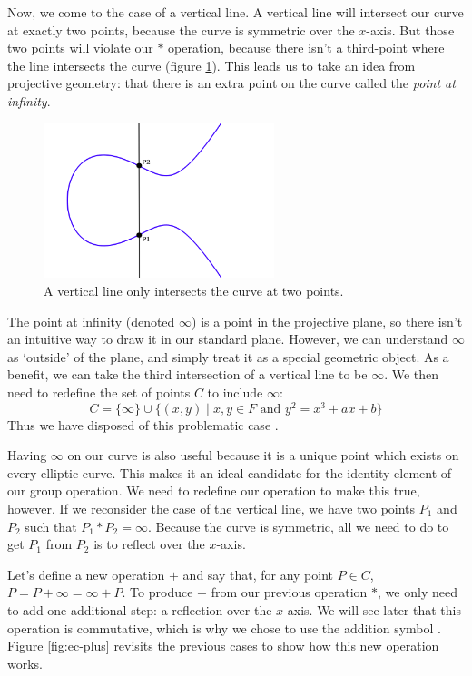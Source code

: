 \documentclass{article}
\begin{document}
Now, we come to the case of a vertical line.
A vertical line will intersect our curve at exactly two points, because the curve is symmetric over the $x$-axis.
But those two points will violate our $*$ operation, because there isn't a third-point where the line intersects the curve (figure \ref{fig:ec-infinity}).
This leads us to take an idea from projective geometry: that there is an extra point on the curve called the \textit{point at infinity}.

\begin{figure}[h]
\centering
\includegraphics[width=0.6\textwidth]{images/ec4-infinity.png}
\caption{A vertical line only intersects the curve at two points.}
\label{fig:ec-infinity}
\end{figure}

The point at infinity (denoted $\infty$) is a point in the projective plane, so there isn't an intuitive way to draw it in our standard plane.
However, we can understand $\infty$ as `outside' of the plane, and simply treat it as a special geometric object.
As a benefit, we can take the third intersection of a vertical line to be $\infty$.
We then need to redefine the set of points $C$ to include $\infty$:
$$C = \{\infty\} \cup \{(x,y) \mid x,y \in F \text{ and } y^2 = x^3 + ax + b\}$$
Thus we have disposed of this problematic case \cite[$\S$2.2]{washington}.

Having $\infty$ on our curve is also useful because it is a unique point which exists on every elliptic curve.
This makes it an ideal candidate for the identity element of our group operation.
We need to redefine our operation to make this true, however.
If we reconsider the case of the vertical line, we have two points $P_1$ and $P_2$ such that $P_1 * P_2 = \infty$.
Because the curve is symmetric, all we need to do to get $P_1$ from $P_2$ is to reflect over the $x$-axis.

Let's define a new operation $+$ and say that, for any point $P \in C$, $P = P+\infty = \infty+P$.
To produce $+$ from our previous operation $*$, we only need to add one additional step: a reflection over the $x$-axis.
We will see later that this operation is commutative, which is why we chose to use the addition symbol \cite[$\S$2.2]{washington}.
Figure \ref{fig:ec-plus} revisits the previous cases to show how this new operation works.
\end{document}
